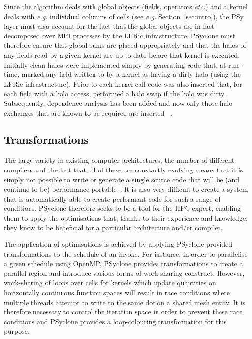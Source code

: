 \documentclass[review,times]{elsarticle}
\begin{document}
Since the algorithm deals with global objects
(fields, operators {\em etc.})  and a kernel deals with {\em e.g.} individual
columns of cells (see {\em e.g.} Section~\ref{sec:intro}), 
the PSy layer must also account for the fact that
the global objects are in fact decomposed over MPI processes by the
LFRic infrastructure. PSyclone must therefore ensure that global sums
are placed appropriately and that the halos of any fields read by a
given kernel are up-to-date before that kernel is executed. Initially
clean halos were implemented simply by generating code that, at
run-time, marked any field written to by a kernel as having a dirty
halo (using the LFRic infrastructure). Prior to each kernel call code
was also inserted that, for each field with a halo access, performed a
halo swap if the halo was dirty. Subsequently, dependence analysis has
been added and now only those halo exchanges that are known to be
required are inserted ~\cite{psyclone}.

\subsection{Transformations}

The large variety in existing computer architectures, the number of
different compilers and the fact that all of these are constantly
evolving means that it is simply not possible to write or generate a
single source code that will be (and continue to be) performance
portable~\cite{shallow_psykal, nemolite2d_psykal}.  It is also very
difficult to create a system that is automatically able to create
performant code for such a range of conditions. PSyclone therefore
seeks to be a tool for the HPC expert, enabling them to apply the
optimisations that, thanks to their experience and knowledge, they
know to be beneficial for a particular architecture and/or compiler.

The application of optimisations is achieved by applying
PSyclone-provided transformations to the schedule of an invoke.  For
instance, in order to parallelise a given schedule using OpenMP,
 PSyclone provides transformations to create a parallel region and
introduce various forms of work-sharing construct. However,
work-sharing of loops over cells for kernels which update quantities
on horizontally continuous function spaces will result in race
conditions where multiple threads attempt to write to the same dof on
a shared mesh entity. It
is therefore necessary to control the iteration space in order to
prevent these race conditions and PSyclone provides a loop-colouring
transformation for this purpose.
\end{document}
